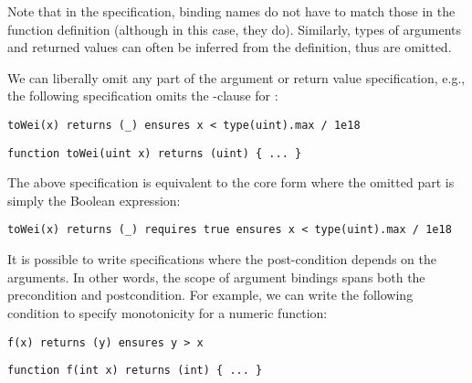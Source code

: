 Note that in the specification, binding names do not have to match 
those in the function definition (although in this case, they do). 
Similarly, types of arguments and returned values can often be inferred from
the definition, thus are omitted.

We can liberally omit any part of the argument or return value specification,
e.g., the following specification omits the -clause for : %
\begin{lstlisting}[language=Consol]
toWei(x) returns (_) ensures x < type(uint).max / 1e18
\end{lstlisting}
\vspace{-0.25em}
\begin{lstlisting}
function toWei(uint x) returns (uint) { ... }
\end{lstlisting}
The above specification is equivalent to the core form where the omitted 
part is simply the Boolean  expression:
\begin{lstlisting}[language=Consol]
toWei(x) returns (_) requires true ensures x < type(uint).max / 1e18
\end{lstlisting}

It is possible to write specifications where the post-condition depends on 
the arguments. 
In other words, the scope of argument bindings spans both the precondition 
and postcondition.
For example, we can write the following condition to specify monotonicity for a numeric function:
\begin{lstlisting}[language=Consol]
f(x) returns (y) ensures y > x
\end{lstlisting}
\vspace{-0.25em}
\begin{lstlisting}[language=Solidity]
function f(int x) returns (int) { ... }
\end{lstlisting}


